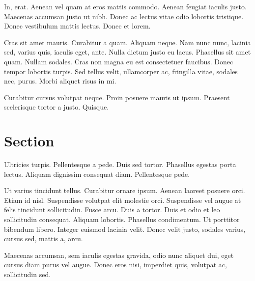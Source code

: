 \documentclass[a4paper]{article}
\begin{document}
In, erat. Aenean vel quam at eros mattis commodo. Aenean feugiat iaculis justo.
Maecenas accumsan justo ut nibh. Donec ac lectus vitae odio lobortis tristique.
Donec vestibulum mattis lectus. Donec et lorem.

Cras sit amet mauris. Curabitur a quam. Aliquam neque. Nam nunc nunc, lacinia
sed, varius quis, iaculis eget, ante. Nulla dictum justo eu lacus. Phasellus sit
amet quam. Nullam sodales. Cras non magna eu est consectetuer faucibus. Donec
tempor lobortis turpis. Sed tellus velit, ullamcorper ac, fringilla vitae,
sodales nec, purus. Morbi aliquet risus in mi.

Curabitur cursus volutpat neque. Proin posuere mauris ut ipsum. Praesent
scelerisque tortor a justo. Quisque.

%
%

\newpage
\appendix

\section{Section}

Ultricies turpis. Pellentesque a pede. Duis sed tortor. Phasellus egestas porta
lectus. Aliquam dignissim consequat diam. Pellentesque pede.

Ut varius tincidunt tellus. Curabitur ornare ipsum. Aenean laoreet posuere orci.
Etiam id nisl. Suspendisse volutpat elit molestie orci. Suspendisse vel augue at
felis tincidunt sollicitudin. Fusce arcu. Duis a tortor. Duis et odio et leo
sollicitudin consequat. Aliquam lobortis. Phasellus condimentum. Ut porttitor
bibendum libero. Integer euismod lacinia velit. Donec velit justo, sodales
varius, cursus sed, mattis a, arcu.

Maecenas accumsan, sem iaculis egestas gravida, odio nunc aliquet dui, eget
cursus diam purus vel augue. Donec eros nisi, imperdiet quis, volutpat ac,
sollicitudin sed.


%
\end{document}
